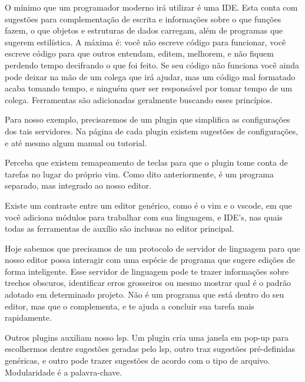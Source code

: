 O mínimo que um programador moderno irá utilizar é uma IDE.
Esta conta com sugestões para complementação de escrita e informações sobre o
que funções fazem, o que objetos e estruturas de dados carregam, além de
programas que sugerem estilística.
A máxima é: você não escreve código para funcionar, você escreve código para que outros entendam,
editem, melhorem, e não fiquem perdendo tempo decifrando o que foi feito.
Se seu código não funciona você ainda pode deixar na mão de um colega que irá ajudar,
mas um código mal formatado acaba tomando tempo, e ninguém quer ser responsável por tomar
tempo de um colega.
Ferramentas são adicionadas geralmente buscando esses princípios.

Para nosso exemplo, precisaremos de um plugin que simplifica as configurações dos tais servidores.
Na página de cada plugin existem sugestões de configurações, e até mesmo
algum manual ou tutorial. 


Perceba que existem remapeamento de teclas para que o plugin tome conta de tarefas no lugar do próprio vim.
Como dito anteriormente, é um programa separado, mas integrado ao nosso editor.

Existe um contraste entre um editor genérico, como é o vim e o vscode,
em que você adiciona módulos para trabalhar com sua linguagem, e IDE's,
nas quais todas as ferramentas de auxílio são inclusas no editor principal.

Hoje sabemos que precisamos de um protocolo de servidor de linguagem 
para que nosso editor possa
interagir com uma espécie de programa que sugere edições de forma inteligente.
Esse servidor de linguagem pode te trazer informações sobre trechos obscuros, identificar erros grosseiros
ou mesmo mostrar qual é o padrão adotado em determinado projeto.
Não é um programa que está dentro do seu editor, mas que o complementa,
e te ajuda a concluir sua tarefa mais rapidamente.

Outros plugins auxiliam nosso lsp. Um plugin cria uma janela em pop-up para escolhermos dentre sugestões geradas pelo lsp,
outro traz sugestões pré-definidas genéricas, e outro pode trazer sugestões de acordo com o tipo de arquivo.
Modularidade é a palavra-chave.


